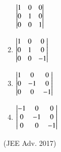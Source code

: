 \documentclass[journal,12pt,twocolumn]{IEEEtran}
\theoremstyle{remark}
\begin{document}
\begin{enumerate}[label=\arabic*)]
\begin{enumerate}[label=(\alph*)]
								$\begin{vmatrix}
									1&0&0\\
									0&1&0\\
									0&0&1
								\end{vmatrix}$\\
							\item 
								$\begin{vmatrix}
									1&0&0\\
									0&1&0\\
									0&0&-1
								\end{vmatrix}$\\
							\item 
								$\begin{vmatrix}
									1&0&0\\
									0&-1&0\\
									0&0&-1
								\end{vmatrix}$\\
							\item 
								$\begin{vmatrix}
									-1&0&0\\
									0&-1&0\\
									0&0&-1
								\end{vmatrix}$\\
						\end{enumerate}
						\hfill (JEE Adv. 2017)\\
						\begin{comment}
					\item
						Let $S$ be the set of all column matrices 
												$\mydet{						
													b_1\\
													b_2\\
													b_3
												}$
						such that $b_1, b_2, b_3, \in \mathbb{R}$ and the system of equations \brak{in real variables} $$-x+2y+5z=b_1$$ $$2x-4y+3z=b_2$$  $$x-2y+2z=b_3$$ has atleast one solution. Then, which of the following system\brak{s} \brak{in real variables} has\brak{have} at least one solution for each  
												$\mydet{
													b_1\\
													b_2\\
													b_3
												}$
						$\in S$?
						\begin{enumerate}
							\item $x+2y+3z=b_1, 4y+5z=b_2 $ and $x+2y+6z=b_3$
							\item $x+y+3z=b_1, 5x+2y+6z=b_2 $ and $-2x+y-3z=b_3$
							\item $-x+2y+-5z=b_1, 2x-4y+10z=b_2 $ and $x-2y+5z=b_3$
							\item $sx+2y+5z=b_1, 2x+3z=b_2 $ and $x+4y-5z=b_3$
						\end{enumerate}
						\hfill \brak{JEE Adv. 2018}
						\end{comment}


			\end{enumerate}
		
	
\end{document}
